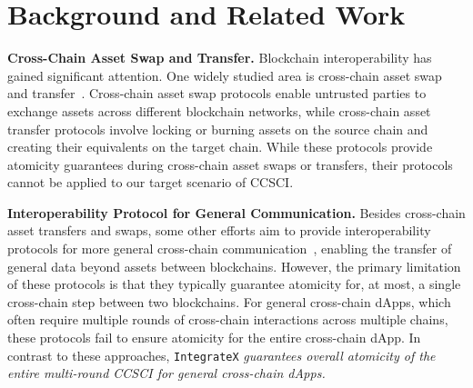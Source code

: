 \section{Background and Related Work}
\label{related_work}


\noindent
\textbf{Cross-Chain Asset Swap and Transfer.}
Blockchain interoperability has gained significant attention. 
One widely studied area is cross-chain asset swap and transfer~\cite{2019atomicBEswap,Xu2021htlc,Luo2024crosschannel,Manevich2022ccas,tian2021enabling,herlihy2018atomic,deshpande2020privacy,thyagarajan2022universal,chen2024pacdam,yin2022sidechain,zamyatin2019xclaim}. 
Cross-chain asset swap protocols enable untrusted parties to exchange assets across different blockchain networks, while cross-chain asset transfer protocols involve locking or burning assets on the source chain and creating their equivalents on the target chain. 
While these protocols provide atomicity guarantees during cross-chain asset swaps or transfers, their protocols cannot be applied to our target scenario of CCSCI.


\vspace{3pt}
\noindent
\textbf{Interoperability Protocol for General Communication.}
Besides cross-chain asset transfers and swaps, some other efforts aim to provide interoperability protocols for more general cross-chain communication~\cite{nissl2021towards,wood2016polkadot,cosmos2019,abebe2019enabling,darshan2023an,reigsbergen2023demo,ghosh2021leveraging,garoffolo2020zendoo}, enabling the transfer of general data beyond assets between blockchains. 
However, the primary limitation of these protocols is that they typically guarantee atomicity for, at most, a single cross-chain step between two blockchains. 
For general cross-chain dApps, which often require multiple rounds of cross-chain interactions across multiple chains, these protocols fail to ensure atomicity for the entire cross-chain dApp. 
In contrast to these approaches, \texttt{IntegrateX} \emph{guarantees overall atomicity of the entire multi-round CCSCI for general cross-chain dApps.}

